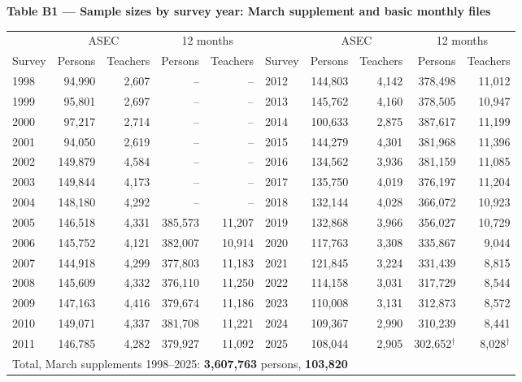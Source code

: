 \documentclass[11pt]{article}
\begin{document}
\begin{center}
{\large\bfseries Table B1 --- Sample sizes by survey year:
March supplement and basic monthly files}\\[1.0em]
\begin{threeparttable}
\begin{tabular}{l rr rr @{\hskip 1.3em} l rr rr}
\toprule
 & \multicolumn{2}{c}{ASEC} & \multicolumn{2}{c}{12 months}
 & & \multicolumn{2}{c}{ASEC} & \multicolumn{2}{c}{12 months} \\
\cmidrule(lr){2-3}\cmidrule(lr){4-5}\cmidrule(lr){7-8}\cmidrule(lr){9-10}
Survey & Persons & Teachers & Persons & Teachers
 & Survey & Persons & Teachers & Persons & Teachers \\
\midrule
1998 & 94,990 & 2,607 & -- & -- & 2012 & 144,803 & 4,142 & 378,498 & 11,012 \\
1999 & 95,801 & 2,697 & -- & -- & 2013 & 145,762 & 4,160 & 378,505 & 10,947 \\
2000 & 97,217 & 2,714 & -- & -- & 2014 & 100,633 & 2,875 & 387,617 & 11,199 \\
2001 & 94,050 & 2,619 & -- & -- & 2015 & 144,279 & 4,301 & 381,968 & 11,396 \\
2002 & 149,879 & 4,584 & -- & -- & 2016 & 134,562 & 3,936 & 381,159 & 11,085 \\
2003 & 149,844 & 4,173 & -- & -- & 2017 & 135,750 & 4,019 & 376,197 & 11,204 \\
2004 & 148,180 & 4,292 & -- & -- & 2018 & 132,144 & 4,028 & 366,072 & 10,923 \\
2005 & 146,518 & 4,331 & 385,573 & 11,207 & 2019 & 132,868 & 3,966 & 356,027 & 10,729 \\
2006 & 145,752 & 4,121 & 382,007 & 10,914 & 2020 & 117,763 & 3,308 & 335,867 & 9,044 \\
2007 & 144,918 & 4,299 & 377,803 & 11,183 & 2021 & 121,845 & 3,224 & 331,439 & 8,815 \\
2008 & 145,609 & 4,332 & 376,110 & 11,250 & 2022 & 114,158 & 3,031 & 317,729 & 8,544 \\
2009 & 147,163 & 4,416 & 379,674 & 11,186 & 2023 & 110,008 & 3,131 & 312,873 & 8,572 \\
2010 & 149,071 & 4,337 & 381,708 & 11,221 & 2024 & 109,367 & 2,990 & 310,239 & 8,441 \\
2011 & 146,785 & 4,282 & 379,927 & 11,092 & 2025 & 108,044 & 2,905 & 302,652$^{\dagger}$ & 8,028$^{\dagger}$ \\
\midrule
\multicolumn{10}{l}{Total, March supplements 1998--2025:\quad
\textbf{3,607,763} persons, \textbf{103,820}
}
\end{tabular}
\end{threeparttable}
\end{center}
\end{document}
